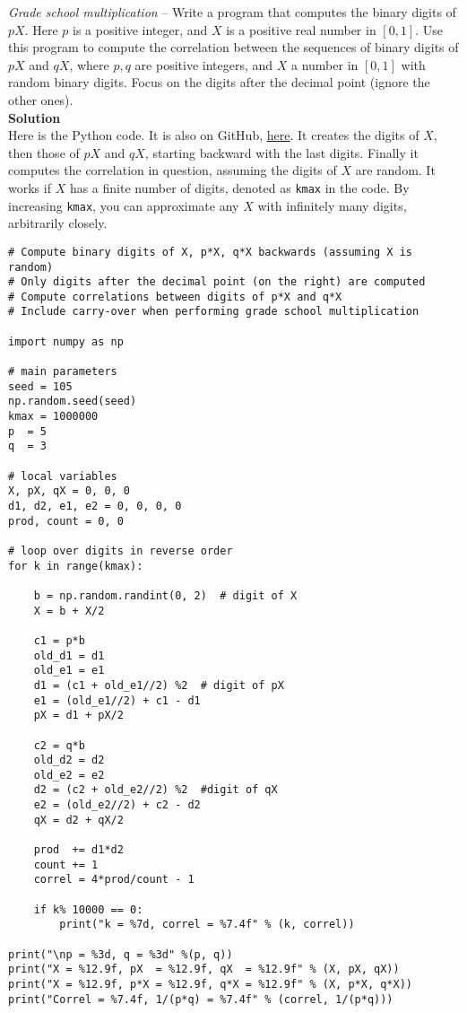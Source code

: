 \documentclass[oneside,10pt]{book}
\begin{document}
\begin{Exercise}\label{knoy55wc} {\em Grade school multiplication} -- Write a program that computes the binary digits of $pX$. Here $p$ is a positive integer, and $X$ is a positive real number in $[0, 1]$. Use this program to compute the correlation between the sequences of binary digits of $pX$ and $qX$, where $p,q$ are positive integers, and $X$ a number in $[0, 1]$ with random binary digits. Focus on the digits after the decimal point (ignore the other ones).
\vspace{1ex} \\
{\bf Solution} \\
Here is the Python code. It is also on GitHub, \href{https://github.com/VincentGranville/Stochastic-Processes/blob/master/lottery_correl.py}{here}. It creates the digits of $X$, then those of $pX$ and $qX$, starting backward with the last digits. Finally it computes the correlation in question, assuming the digits of $X$ are random. It works if $X$ has a finite number of digits, denoted as \texttt{kmax} in the code. By increasing \texttt{kmax}, you can approximate any $X$ with infinitely many digits, arbitrarily closely.
\end{Exercise}
\begin{lstlisting}
# Compute binary digits of X, p*X, q*X backwards (assuming X is random)
# Only digits after the decimal point (on the right) are computed
# Compute correlations between digits of p*X and q*X
# Include carry-over when performing grade school multiplication

import numpy as np

# main parameters
seed = 105
np.random.seed(seed)
kmax = 1000000
p  = 5
q  = 3

# local variables
X, pX, qX = 0, 0, 0
d1, d2, e1, e2 = 0, 0, 0, 0
prod, count = 0, 0

# loop over digits in reverse order
for k in range(kmax):

    b = np.random.randint(0, 2)  # digit of X
    X = b + X/2

    c1 = p*b
    old_d1 = d1
    old_e1 = e1
    d1 = (c1 + old_e1//2) %2  # digit of pX
    e1 = (old_e1//2) + c1 - d1
    pX = d1 + pX/2

    c2 = q*b
    old_d2 = d2
    old_e2 = e2
    d2 = (c2 + old_e2//2) %2  #digit of qX
    e2 = (old_e2//2) + c2 - d2
    qX = d2 + qX/2

    prod  += d1*d2
    count += 1
    correl = 4*prod/count - 1

    if k% 10000 == 0:
        print("k = %7d, correl = %7.4f" % (k, correl))

print("\np = %3d, q = %3d" %(p, q))
print("X = %12.9f, pX  = %12.9f, qX  = %12.9f" % (X, pX, qX))
print("X = %12.9f, p*X = %12.9f, q*X = %12.9f" % (X, p*X, q*X))
print("Correl = %7.4f, 1/(p*q) = %7.4f" % (correl, 1/(p*q)))
\end{lstlisting}
\end{document}
